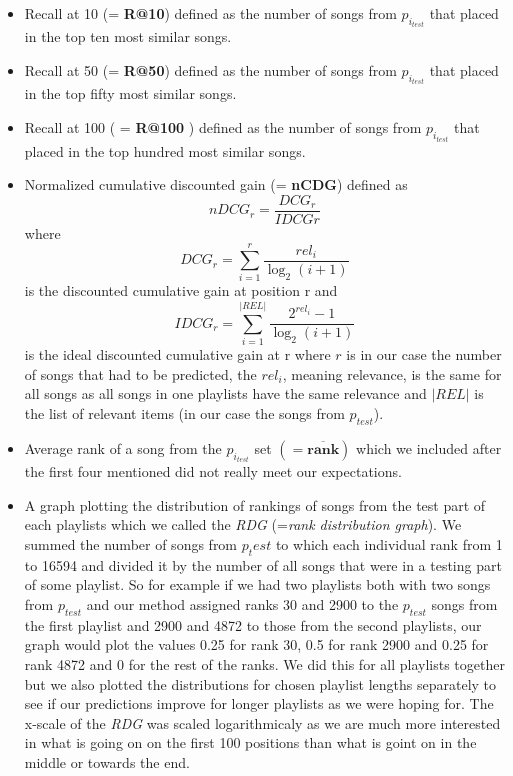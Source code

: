 \begin{itemize}
    \item Recall at 10 (= \textbf{R@10}) defined as the number of songs from $p_{i_{test}} $ that placed in the top ten most similar songs.
    \item Recall at 50 (= \textbf{R@50}) defined as the number of songs from $p_{i_{test}} $ that placed in the top fifty most similar songs.
    \item Recall at 100 ( = \textbf{R@100} ) defined as the number of songs from $p_{i_{test}} $ that placed in the top hundred most similar songs.
    \item Normalized cumulative discounted gain (= \textbf{nCDG}) defined as 
    $${nDCG_{r}} = \frac{DCG_{r}}{IDCG{r}} $$
    where 
    $${DCG_{r}} =\sum_{i=1}^{r}{\frac {rel_{i}}{\log _{2}(i+1)}} $$ 
    is the discounted cumulative gain at position r and 
    $$ {IDCG_{r}} =\sum _{i=1}^{|REL|}{\frac {2^{rel_{i}}-1}{\log _{2}(i+1)}} $$
    is the ideal discounted cumulative gain at r
    where $r$ is in our case the number of songs that had to be predicted, the $rel_i$, meaning relevance, is the same for all songs as all songs in one playlists have the same relevance and $|REL|$ is the list of relevant items (in our case the songs from $p_{test}$).
    \item Average rank of a song from the $p_{i_{test}}$ set $ \boldsymbol{ (= \overline{rank})} $ which we included after the first four mentioned did not really meet our expectations.
    \item A graph plotting the distribution of rankings of songs from the test part of each playlists which we called the \textit{RDG} (=\textit{rank distribution graph}). We summed the number of songs from $p_test$ to which each individual rank from 1 to 16594 and divided it by the number of all songs that were in a testing part of some playlist. So for example if we had two playlists both with two songs from $p_{test}$ and our method assigned ranks 30 and 2900 to the $p_{test}$ songs from the first playlist and 2900 and 4872 to those from the second playlists, our graph would plot the values 0.25 for rank 30, 0.5 for rank 2900 and 0.25 for rank 4872 and 0 for the rest of the ranks. We did this for all playlists together but we also plotted the distributions for chosen playlist lengths separately to see if our predictions improve for longer playlists as we were hoping for. The x-scale of the \textit{RDG} was scaled logarithmicaly as we are much more interested in what is going on on the first 100 positions than what is goint on in the middle or towards the end. \\

\end{itemize}
